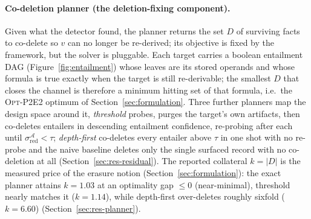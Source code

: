 \documentclass[letterpaper]{article}
\begin{document}
\paragraph{Co-deletion planner (the deletion-fixing component).} Given what the detector
found, the planner returns the set $D$ of surviving facts to co-delete so $v$ can no longer
be re-derived; its objective is fixed by the framework, but the solver is pluggable.
Each target carries a boolean entailment DAG (Figure~\ref{fig:entailment}) whose
leaves are its stored operands and whose formula is true exactly when the target is still
re-derivable; the smallest $D$ that closes the channel is therefore a minimum hitting
set of that formula, i.e.\ the \textsc{Opt-P2E2} optimum of Section~\ref{sec:formulation}.
Three further planners map the design space around it, \emph{threshold} probes, purges the target's own artifacts, then co-deletes entailers in descending entailment confidence, re-probing after each until
$\sigma_{\mathrm{red}}^{\mathcal{A}}<\tau$; \emph{depth-first} co-deletes every entailer
above $\tau$ in one shot with no re-probe and the naive baseline deletes only the
single surfaced record with no co-deletion at all (Section~\ref{sec:res-residual}). The
reported collateral $k=|D|$ is the measured price of the erasure notion
(Section~\ref{sec:formulation}): the exact planner attains $k=1.03$ at an optimality gap
$\le0$ (near-minimal), threshold nearly matches it ($k=1.14$), while depth-first
over-deletes roughly sixfold ($k=6.60$) (Section~\ref{sec:res-planner}). 
\end{document}
